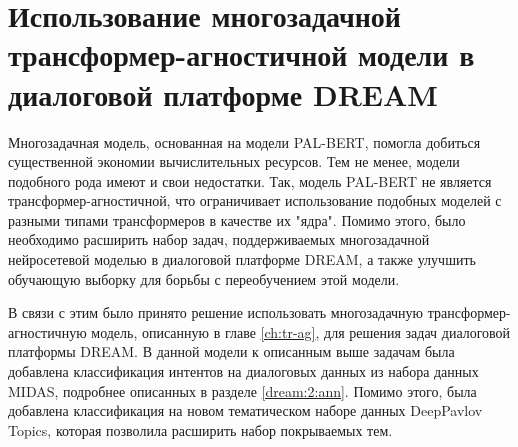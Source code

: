 \section{Использование многозадачной трансформер-агностичной модели в диалоговой платформе DREAM} 

Многозадачная модель, основанная на модели PAL-BERT, помогла добиться существенной экономии вычислительных ресурсов. Тем не менее, модели подобного рода имеют и свои недостатки. Так, модель PAL-BERT не является трансформер-агностичной, что ограничивает использование подобных моделей с разными типами трансформеров в качестве их "ядра". Помимо этого, было необходимо расширить набор задач, поддерживаемых многозадачной  нейросетевой моделью в диалоговой платформе DREAM, а также  улучшить обучающую выборку для борьбы с переобучением этой модели. 

В связи с этим было принято решение использовать многозадачную трансформер-агностичную модель, описанную в главе \ref{ch:tr-ag}, для решения задач диалоговой платформы DREAM. В данной модели к описанным выше задачам была добавлена классификация интентов на диалоговых данных из набора данных MIDAS, подробнее описанных в разделе \ref{dream:2:ann}. Помимо этого, была добавлена классификация на новом тематическом наборе данных DeepPavlov Topics\cite{dp_topics}, которая позволила расширить набор покрываемых тем. 

